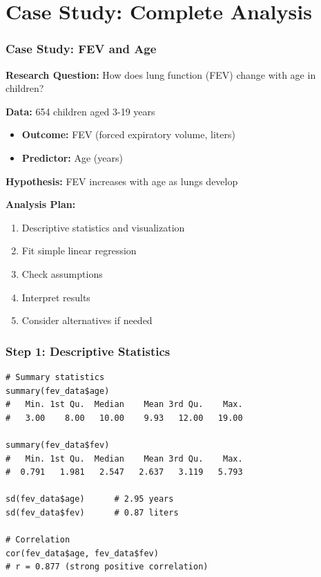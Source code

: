 \documentclass{beamer}
\begin{document}
\section{Case Study: Complete Analysis}

\begin{frame}
\frametitle{Case Study: FEV and Age}
\textbf{Research Question:} How does lung function (FEV) change with age in children?

\vspace{0.3cm}
\textbf{Data:} 654 children aged 3-19 years
\begin{itemize}
\item \textbf{Outcome:} FEV (forced expiratory volume, liters)
\item \textbf{Predictor:} Age (years)
\end{itemize}

\vspace{0.3cm}
\textbf{Hypothesis:} FEV increases with age as lungs develop

\vspace{0.3cm}
\textbf{Analysis Plan:}
\begin{enumerate}
\item Descriptive statistics and visualization
\item Fit simple linear regression
\item Check assumptions
\item Interpret results
\item Consider alternatives if needed
\end{enumerate}
\end{frame}

\begin{frame}[fragile]
\frametitle{Step 1: Descriptive Statistics}
\small
\begin{verbatim}
# Summary statistics
summary(fev_data$age)
#   Min. 1st Qu.  Median    Mean 3rd Qu.    Max.
#   3.00    8.00   10.00    9.93   12.00   19.00

summary(fev_data$fev)
#   Min. 1st Qu.  Median    Mean 3rd Qu.    Max.
#  0.791   1.981   2.547   2.637   3.119   5.793

sd(fev_data$age)      # 2.95 years
sd(fev_data$fev)      # 0.87 liters

# Correlation
cor(fev_data$age, fev_data$fev)
# r = 0.877 (strong positive correlation)
\end{verbatim}
\end{frame}
\end{document}
